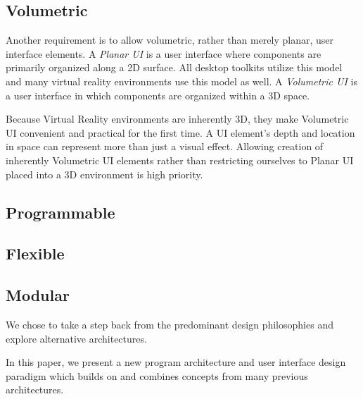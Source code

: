 \documentclass[conference,12pt]{IEEEtran}
\begin{document}
\subsection{Volumetric}
Another requirement is to allow volumetric, rather than merely planar, user
interface elements. A \textit{Planar UI} is a user interface where components
are primarily organized along a 2D surface. All desktop toolkits utilize this
model and many virtual reality environments use this model as well. A
\textit{Volumetric UI} is a user interface in which components are organized
within a 3D space.

Because Virtual Reality environments are inherently 3D, they make Volumetric UI
convenient and practical for the first time. A UI element's depth and location
in space can represent more than just a visual effect. Allowing creation of
inherently Volumetric UI elements rather than restricting ourselves to Planar UI
placed into a 3D environment is high priority.

\subsection{Programmable}

\subsection{Flexible}

\subsection{Modular}

We chose to take a step back from the predominant design philosophies and
explore alternative architectures.


In this paper, we present a new program architecture and user interface design
paradigm which builds on and combines concepts from many previous architectures.
\end{document}
